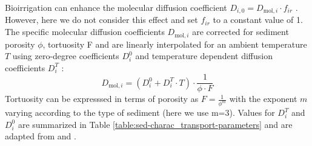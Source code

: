 \documentclass[gmd, manuscript]{copernicus}
\begin{document}
Bioirrigation can enhance the molecular diffusion coefficient $D_{i,0}=D_{\mathrm{mol},i}\cdot f_{ir}$ \citep{soetaert1996dynamic}. However, here we do not consider this effect 
and set $f_{ir}$ to a constant value of 1. The specific molecular diffusion coefficients $D_{\mathrm{mol},i}$ are corrected for sediment porosity $\phi$, tortuosity F and are linearly interpolated for an ambient temperature $T$ using zero-degree 
coefficients $D^0_i$ and temperature dependent diffusion coefficients $D^T_i$ \citep[compare ][]{gypens_simple_2008}:
\begin{equation*}
 D_{\mathrm{mol},i} = (D^0_i + D^T_i \cdot T )\cdot \frac{1}{\phi\cdot F}
\end{equation*}
Tortuosity can be expresssed in terms of porosity as $F = \frac{1}{\phi^m}$ \citep{ullman_diffusion_1982} with the exponent $m$ varying according to the type of sediment (here we use m=3). 
Values for $D^T_i$ and $D^0_i$ are summarized in Table \ref{table:sed-charac_transport-parameters} and are adapted from \citet{Li_diffusion_1974} and \citet{gypens_simple_2008}.
\end{document}
